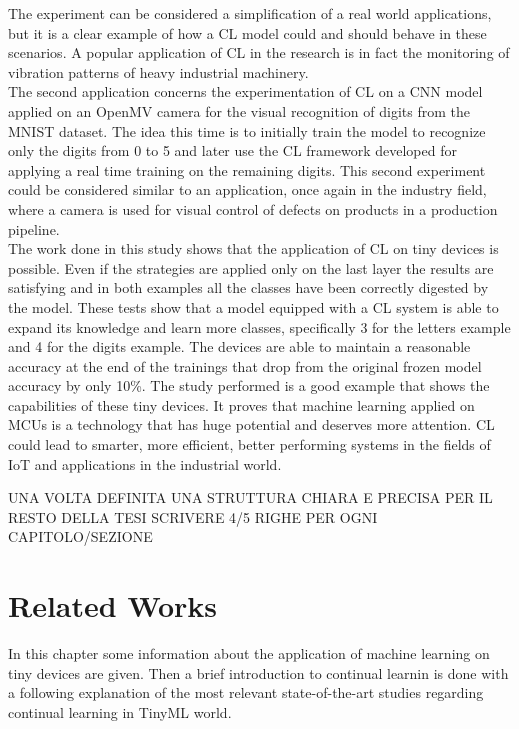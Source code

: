 \documentclass[12pt]{report}
\begin{document}
The experiment can be considered a simplification of a real world applications, but it is a clear example of how a CL model could and should behave in these scenarios. A popular application of CL in the research is in fact the monitoring of vibration patterns of heavy industrial machinery. \\
The second application concerns the experimentation of CL on a CNN model applied on an OpenMV camera for the visual recognition of digits from the MNIST dataset. The idea this time is to initially train the model to recognize only the digits from 0 to 5 and later use the CL framework developed for applying a real time training on the remaining digits. This second experiment could be considered similar to an application, once again in the industry field, where a camera is used for visual control of defects on products in a production pipeline.  \\
The work done in this study shows that the application of CL on tiny devices is possible. Even if the strategies are applied only on the last layer the results are satisfying and in both examples all the classes have been correctly digested by the model. These tests show that a model equipped with a CL system is able to expand its knowledge and learn more classes, specifically 3 for the letters example and 4 for the digits example. The devices are able to maintain a reasonable accuracy at the end of the trainings that drop from the original frozen model accuracy by only 10\%. 
The study performed is a good example that shows the capabilities of these tiny devices. It proves that machine learning applied on MCUs is a technology that has huge potential and deserves more attention. CL could lead to smarter, more efficient, better performing systems in the fields of IoT and applications in the industrial world.
\bigskip

UNA VOLTA DEFINITA UNA STRUTTURA CHIARA E PRECISA PER IL RESTO DELLA TESI SCRIVERE 4/5 RIGHE PER OGNI CAPITOLO/SEZIONE


\chapter{Related Works}

In this chapter some information about the application of machine learning on tiny devices are given. Then a brief introduction to continual learnin is done with a following explanation of the most relevant state-of-the-art studies regarding continual learning in TinyML world. 
\end{document}
